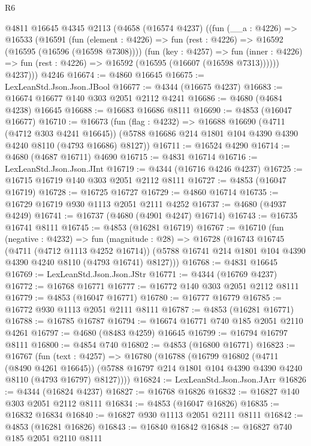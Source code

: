 \begin{lexlean}{R6}
\begin{coremodule}
    @4811
      @16645
      @4345
      @2113
      (@4658
        (@16574 @4237)
        ((fun (__a : @4226) =>
        @16533
          (@16591
            (fun (element : @4226) => fun (rest : @4226) => @16592 (@16595 (@16596 (@16598 @7308))))
            (fun (key : @4257) =>
            fun (inner : @4226) => fun (rest : @4226) => @16592 (@16595 (@16607 (@16598 @7313))))))
          @4237)))
    @4246
@16674 := @4860 @16645
@16675 := LexLeanStd.Json.Json.JBool
@16677 := @4344 (@16675 @4237)
@16683 := @16674 @16677 @140 @303 @2051 @2112 @4241
@16686 := @4680 (@4684 @4238) @16645
@16688 := @16683 @16686 @8111
@16690 := @4853 (@16047 @16677)
@16710 := @16673
    (fun (flag : @4232) =>
    @16688
      @16690
      (@4711 (@4712 @303 @4241 @16645))
      (@5788 @16686 @214 @1801 @104 @4390 @4390 @4240 @8110 (@4793 @16686) @8127))
@16711 := @16524 @4290
@16714 := @4680 (@4687 @16711) @4690
@16715 := @4831 @16714
@16716 := LexLeanStd.Json.Json.JInt
@16719 := @4344 (@16716 @4246 @4237)
@16725 := @16715 @16719 @140 @303 @2051 @2112 @8111
@16727 := @4853 (@16047 @16719)
@16728 := @16725 @16727
@16729 := @4860 @16714
@16735 := @16729 @16719 @930 @1113 @2051 @2111 @4252
@16737 := @4680 (@4937 @4249)
@16741 := @16737 (@4680 (@4901 @4247) @16714)
@16743 := @16735 @16741 @8111
@16745 := @4853 (@16281 @16719)
@16767 := @16710
    (fun (negative : @4232) =>
    fun (magnitude : @28) =>
    @16728
      (@16743
        @16745
        (@4711 (@4712 @1113 @4252 @16714))
        (@5788 @16741 @214 @1801 @104 @4390 @4390 @4240 @8110 (@4793 @16741) @8127)))
@16768 := @4831 @16645
@16769 := LexLeanStd.Json.Json.JStr
@16771 := @4344 (@16769 @4237)
@16772 := @16768 @16771
@16777 := @16772 @140 @303 @2051 @2112 @8111
@16779 := @4853 (@16047 @16771)
@16780 := @16777 @16779
@16785 := @16772 @930 @1113 @2051 @2111 @8111
@16787 := @4853 (@16281 @16771)
@16788 := @16785 @16787
@16794 := @16674 @16771 @740 @185 @2051 @2110 @4261
@16797 := @4680 (@8483 @4259) @16645
@16799 := @16794 @16797 @8111
@16800 := @4854 @740
@16802 := @4853 (@16800 @16771)
@16823 := @16767
    (fun (text : @4257) =>
    @16780
      (@16788
        (@16799
          @16802
          (@4711 (@8490 @4261 @16645))
          (@5788 @16797 @214 @1801 @104 @4390 @4390 @4240 @8110 (@4793 @16797) @8127))))
@16824 := LexLeanStd.Json.Json.JArr
@16826 := @4344 (@16824 @4237)
@16827 := @16768 @16826
@16832 := @16827 @140 @303 @2051 @2112 @8111
@16834 := @4853 (@16047 @16826)
@16835 := @16832 @16834
@16840 := @16827 @930 @1113 @2051 @2111 @8111
@16842 := @4853 (@16281 @16826)
@16843 := @16840 @16842
@16848 := @16827 @740 @185 @2051 @2110 @8111

\end{coremodule}
\end{lexlean}
